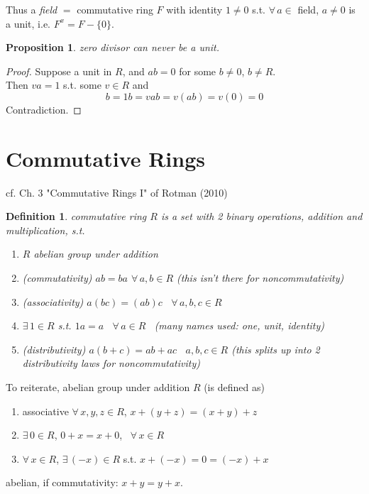 \documentclass[10pt]{amsart}
\newtheorem{proposition}{Proposition}
\newtheorem{definition}{Definition}
\begin{document}
\begin{multicols*}{2}
Thus a \emph{field} $= $ commutative ring $F$ with identity $1\neq 0$ s.t. $\forall \, a\in $ field, $a\neq 0$ is a unit, i.e. $F^x = F - \lbrace 0 \rbrace$. 

\begin{proposition}
	zero divisor can never be a unit. 
\end{proposition}

\begin{proof}
	Suppose a unit in $R$, and $ab=0$ for some $b\neq 0$, $b\neq R$. \\
	Then $va=1$ s.t. some $v\in R$ and 
	\[
	b =1b = vab = v(ab) = v(0) = 0
	\]
	Contradiction.
\end{proof} 	

\section{Commutative Rings}

cf. Ch. 3 "Commutative Rings I" of Rotman (2010) \cite{JRotman2010}


\begin{definition} commutative ring $R$ is a set with 2 binary operations, addition and multiplication, s.t.
	\begin{enumerate}
		\item[(i)] $R$ abelian group under addition 
		\item[(ii)] (commutativity) $ab=ba$ \quad $\forall \, a,b \in R$  (this isn't there for noncommutativity)
		\item[(iii)] (associativity) $a(bc) = (ab)c$ \quad \, $\forall \, a,b,c\in R$
		\item[(iv)] $\exists \, 1 \in R$ s.t. $1a = a$ \, $\forall \, a  \in R$ \quad \, (many names used: one, unit, identity)
		\item[(v)] (distributivity) $a(b+c) = ab+ac$ \quad \, $a,b,c \in R$ (this splits up into 2 distributivity laws for noncommutativity)
	\end{enumerate}
\end{definition}

To reiterate, abelian group under addition $R$ (is defined as)
\begin{enumerate}
	\item associative $\forall \, x , y ,z \in R$, $x + (y+z) = (x+y)+z$ 
	\item $\exists \, 0 \in R$, $0+x = x + 0$, \, $\forall \, x \in R$ 
	\item $\forall \, x \in R$, $\exists \, (-x) \in R$ s.t. $x+(-x) = 0 = (-x) + x$
\end{enumerate}
abelian, if commutativity: $x+y=y+x$.  


\end{multicols*}
\end{document}
